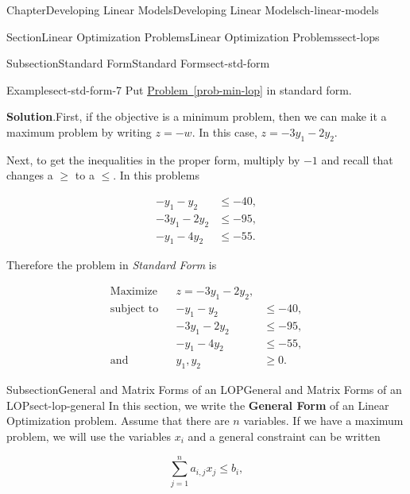 \documentclass[oneside,10pt,]{book}
\newcommand{\blocktitlefont}{\relax}
\newcommand{\xreffont}{\relax}
\newcommand{\terminology}[1]{\textbf{#1}}
\numberwithin{equation}{section}
\newcommand{\amp}{&}
\begin{document}
\begin{chapterptx}{Chapter}{Developing Linear Models}{}{Developing Linear Models}{}{}{ch-linear-models}
\begin{sectionptx}{Section}{Linear Optimization Problems}{}{Linear Optimization Problems}{}{}{sect-lops}
\begin{subsectionptx}{Subsection}{Standard Form}{}{Standard Form}{}{}{sect-std-form}
\begin{example}{Example}{}{sect-std-form-7}%
Put \hyperref[prob-min-lop]{Problem~{\xreffont\ref{prob-min-lop}}} in standard form.%
\par\smallskip%
\noindent\textbf{\blocktitlefont Solution}.\hypertarget{sect-std-form-7-2}{}\quad{}First, if the objective is a minimum problem, then we can make it a maximum problem by writing \(z=-w\). In this case, \(z=-3y_1-2y_2\).%
\par
Next, to get the inequalities in the proper form, multiply by \(-1\) and recall that changes a \(\geq\) to a \(\leq\). In this problems%
\par
%
\begin{align*}
-y_1 - y_2 \amp \leq -40,\\
-3y_1-2y_2 \amp \leq -95,\\
-y_1-4y_2 \amp \leq -55.
\end{align*}
%
\par
Therefore the problem in \emph{Standard Form} is%
\par
%
\begin{equation*}
\begin{aligned} \text{Maximize}\amp \amp z  = -3 y_1 - 2y_2,\amp \\ \text{subject to}\amp\amp -y_1 - y_2 \amp \leq -40, \\ \amp \amp-3y_1-2y_2 \amp \leq -95, \\ \amp \amp -y_1-4y_2 \amp \leq -55,\\ \text{and}\amp\amp y_1, y_2 \amp \geq 0.
\end{aligned}
\end{equation*}
%
\end{example}
\end{subsectionptx}
%
%
\typeout{************************************************}
\typeout{************************************************}
%
\begin{subsectionptx}{Subsection}{General and Matrix Forms of an LOP}{}{General and Matrix Forms of an LOP}{}{}{sect-lop-general}
In this section, we write the \terminology{General Form} of an Linear Optimization problem. Assume that there are \(n\) variables. If we have a maximum problem, we will use the variables \(x_i\) and a general constraint can be written%
\par
%
\begin{equation*}
\sum_{j=1}^n a_{i,j} x_j \leq b_i,
\end{equation*}

\end{subsectionptx}
\end{sectionptx}
\end{chapterptx}
\end{document}
